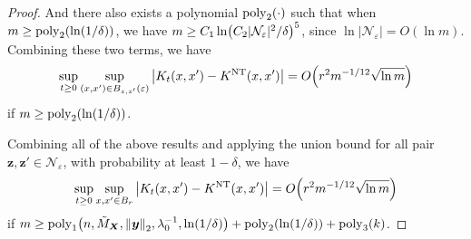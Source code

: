 \begin{proof}
  And there also exists a polynomial $\mathrm{poly}_2(\cdot)$ such that when $m\geq\poly_2\xkm{\ln(1/\delta)}$, we have $m\geq C_1\ln\xkm{C_2|\mathcal{N}_{\varepsilon}|^2/\delta}^5$, since $\ln |\mathcal{N}_{\varepsilon}| = O(\ln m)$.
  Combining these two terms, we have
  \begin{align*}
    \sup_{t \geq 0} \sup_{(\x,\x')\in B_{\z,\z'}(\ep)} \abs{K_t(\x,\x') - \NTK(\x,\x')} = O\xkm{r^2m^{-{1/12}}\sqrt{\ln m}}
  \end{align*}
  if $m\geq\mathrm{poly}_2(\ln(1/\delta))$.

  Combining all of the above results and applying the union bound for all pair $\bm{z},\bm{z}'\in\mathcal{N}_\varepsilon$, with probability at least $1-\delta$, we have
  \begin{align*}
    \sup_{t\geq 0}\sup_{\x,\x'\in B_r}\abs{ K_{t}(\x,\x') - \NTK(\x,\x') } = O\xkm{r^2 m^{-{1}/{12}}\sqrt{\ln m}}
  \end{align*}
  if $m\geq\poly_1\xkm{n,\tilde{M}_{\bm{X}},\norm{\bm{y}}_2,\lambda_0^{-1},\ln(1/\delta)}  + \poly_2(\ln(1/\delta)) + \poly_3(k)$.
\end{proof}
